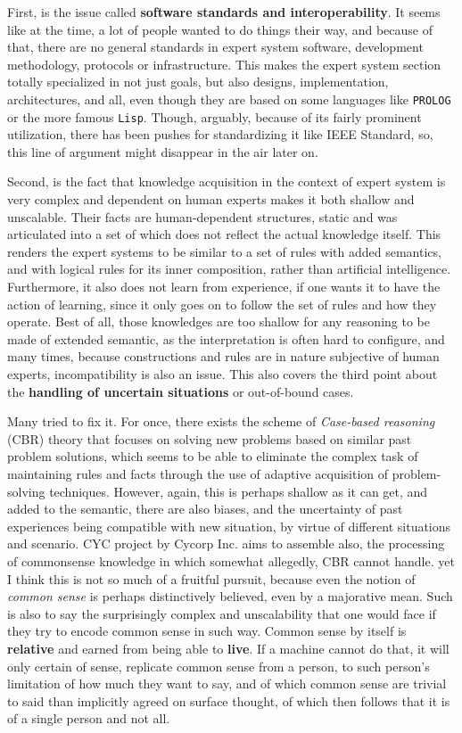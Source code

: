 First, is the issue called \textbf{software standards and interoperability}. It seems like at the time, a lot of people wanted to do things their way, and because of that, there are no general standards in expert system software, development methodology, protocols or infrastructure. This makes the expert system section totally specialized in not just goals, but also designs, implementation, architectures, and all, even though they are based on some languages like \texttt{PROLOG} or the more famous \texttt{Lisp}. Though, arguably, because of its fairly prominent utilization, there has been pushes for standardizing it like IEEE Standard, so, this line of argument might disappear in the air later on. 

Second, is the fact that knowledge acquisition in the context of expert system is very complex and dependent on human experts makes it both shallow and unscalable. Their facts are human-dependent structures, static and was articulated into a set of which does not reflect the actual knowledge itself. This renders the expert systems to be similar to a set of rules with added semantics, and with logical rules for its inner composition, rather than artificial intelligence. Furthermore, it also does not learn from experience, if one wants it to have the action of learning, since it only goes on to follow the set of rules and how they operate. Best of all, those knowledges are too shallow for any reasoning to be made of extended semantic, as the interpretation is often hard to configure, and many times, because constructions and rules are in nature subjective of human experts, incompatibility is also an issue. This also covers the third point about the \textbf{handling of uncertain situations} or out-of-bound cases. 

Many tried to fix it. For once, there exists the scheme of \textit{Case-based reasoning} (CBR) theory that focuses on solving new problems based on similar past problem solutions, which seems to be able to eliminate the complex task of maintaining rules and facts through the use of adaptive acquisition of problem-solving techniques. However, again, this is perhaps shallow as it can get, and added to the semantic, there are also biases, and the uncertainty of past experiences being compatible with new situation, by virtue of different situations and scenario. CYC project by Cycorp Inc. aims to assemble also, the processing of commonsense knowledge in which somewhat allegedly, CBR cannot handle. yet I think this is not so much of a fruitful pursuit, because even the notion of \textit{common sense} is perhaps distinctively believed, even by a majorative mean. Such is also to say the surprisingly complex and unscalability that one would face if they try to encode common sense in such way. Common sense by itself is \textbf{relative} and earned from being able to \textbf{live}. If a machine cannot do that, it will only certain of sense, replicate common sense from a person, to such person's limitation of how much they want to say, and of which common sense are trivial to said than implicitly agreed on surface thought, of which then follows that it is of a single person and not all. 


